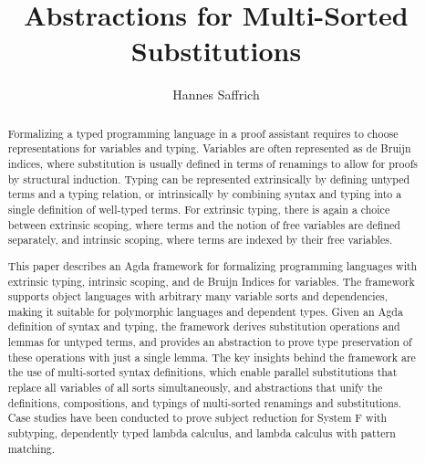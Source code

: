 \documentclass[sigplan,10pt, anonymous]{acmart}
\title{Abstractions for Multi-Sorted Substitutions}
\author{Hannes Saffrich}
\affiliation{
  \institution{University of Freiburg}      %
  \country{Germany}                         %
}
\begin{document}
  \begin{abstract}
    Formalizing a typed programming language in a proof assistant
    requires to choose representations for variables and typing.
    Variables are often represented as de Bruijn indices, where
    substitution is usually defined in terms of renamings to allow for
    proofs by structural induction.
    Typing can be represented extrinsically by defining untyped terms and a typing
    relation, or intrinsically by combining syntax and typing into a single
    definition of well-typed terms.
    For extrinsic typing, there is again a choice between extrinsic
    scoping, where terms and the notion of free variables are defined
    separately, and intrinsic scoping, where terms are indexed by their
    free variables.

    This paper describes an Agda framework for formalizing programming
    languages with extrinsic typing, intrinsic scoping, and de Bruijn
    Indices for variables.
    The framework supports object languages with arbitrary many
    variable sorts and dependencies, making it suitable for
    polymorphic languages and dependent types.
    Given an Agda definition of syntax and typing, the framework derives
    substitution operations and lemmas for untyped terms, and provides an
    abstraction to prove type preservation of these operations with
    just a single lemma.
    The key insights behind the framework are the use of multi-sorted syntax
    definitions, which enable parallel substitutions that replace
    all variables of all sorts simultaneously, and
    abstractions that unify the definitions, compositions, and typings
    of multi-sorted renamings and substitutions.
    Case studies have been conducted to prove subject reduction for
    System F with subtyping, dependently typed lambda calculus, and lambda
    calculus with pattern matching.
  \end{abstract}


\end{document}
